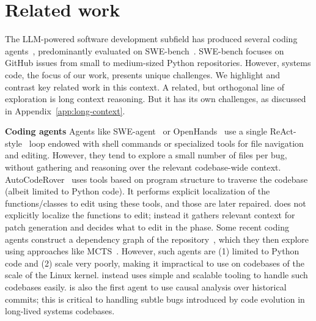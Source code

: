 \section{Related work}
\label{sec:related}
The LLM-powered software development subfield has produced several coding agents~\citep{yang2024sweagentagentcomputerinterfacesenable, xia2024agentlessdemystifyingllmbasedsoftware, openhands, autocoderover, wadhwa2024masai}, predominantly evaluated on SWE-bench~\citep{jimenez2024swebench}. SWE-bench focuses on GitHub issues from small to medium-sized Python repositories. However, systems code, the focus of our work, presents unique challenges.
We highlight and contrast key related work in this context. 
A related, but orthogonal line of exploration is long context reasoning. But it has its own challenges, as discussed in Appendix~\ref{app:long-context}.

\textbf{Coding agents}
Agents like SWE-agent~\citep{yang2024sweagentagentcomputerinterfacesenable} or OpenHands~\citep{openhands} use a single ReAct-style~\citep{yao2023react} loop endowed with shell commands or specialized tools for file navigation and editing. 
However, they tend to explore a small number of files per bug, without gathering and reasoning over the relevant codebase-wide context.
AutoCodeRover~\citep{autocoderover} uses tools based on program structure to traverse the codebase (albeit limited to Python code).
It performs explicit localization of the functions/classes to edit using these tools, and those are later repaired.
\cresearcher{} does not explicitly localize the functions to edit; instead it gathers relevant context for patch generation and decides what to edit in the \synthesisphase phase.
Some recent coding agents construct a dependency graph of the repository~\citep{repograph,locagent}, which they then explore using approaches like MCTS~\citep{lingma}. However, such agents are (1) limited to Python code and (2) scale very poorly, making it impractical to use on codebases of the scale of the Linux kernel. \cresearcher{} instead uses simple and scalable tooling to handle such codebases easily.
\cresearcher{} is also the first agent to use causal analysis over historical commits; this is critical to handling subtle bugs introduced by code evolution in long-lived systems codebases.

